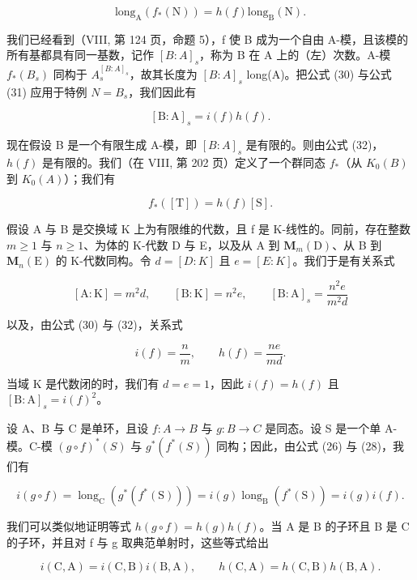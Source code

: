 \[
\mathrm{long} _ {\mathrm{A}} (f _ {*} (\mathrm{N})) = h (f) \mathrm{long} _ {\mathrm{B}} (\mathrm{N}).\tag{31}
\]

我们已经看到（VIII, 第 124 页，命题 5），f 使 B 成为一个自由 A-模，且该模的所有基都具有同一基数，记作 \([B:A]_{s}\)，称为 B 在 A 上的（左）次数。A-模 \(f_{*}(B_{s})\) 同构于 \(A_{s}^{[B:A]_{s}}\)，故其长度为 \([B:A]_{s}\) long(A)。把公式 (30) 与公式 (31) 应用于特例 \(N=B_{s}\)，我们因此有

\[
[ \mathrm{B}: \mathrm{A} ] _ {s} = i (f) h (f).\tag{32}
\]

现在假设 B 是一个有限生成 A-模，即 \([B:A]_{s}\) 是有限的。则由公式 (32)，\(h(f)\) 是有限的。我们（在 VIII, 第 202 页）定义了一个群同态 \(f_{*}\)（从 \(K_{0}(B)\) 到 \(K_{0}(A)\)）；我们有

\[
f _ {*} ([ \mathrm{T} ]) = h (f) [ \mathrm{S} ].\tag{33}
\]

假设 A 与 B 是交换域 K 上为有限维的代数，且 f 是 K-线性的。同前，存在整数 \(m \geqslant 1\) 与 \(n \geqslant 1\)、为体的 K-代数 D 与 E，以及从 A 到 \(\mathbf{M}_{m}(\mathrm{D})\)、从 B 到 \(\mathbf{M}_{n}(\mathrm{E})\) 的 K-代数同构。令 \(d = [D : K]\) 且 \(e = [E : K]\)。我们于是有关系式

\[
[ \mathrm{A}: \mathrm{K} ] = m ^ {2} d, \qquad [ \mathrm{B}: \mathrm{K} ] = n ^ {2} e, \qquad [ \mathrm{B}: \mathrm{A} ] _ {s} = \frac {n ^ {2} e}{m ^ {2} d}
\]

以及，由公式 (30) 与 (32)，关系式

\[
i (f) = \frac {n}{m}, \qquad h (f) = \frac {n e}{m d}.
\]

当域 \(\mathrm{K}\) 是代数闭的时，我们有 \(d = e = 1\)，因此 \(i(f) = h(f)\) 且 \([\mathrm{B}:\mathrm{A}]_s = i(f)^2\)。

设 A、B 与 C 是单环，且设 \(f: A \to B\) 与 \(g: B \to C\) 是同态。设 S 是一个单 A-模。C-模 \((g \circ f)^{*}(S)\) 与 \(g^{*}(f^{*}(S))\) 同构；因此，由公式 (26) 与 (28)，我们有

\[
i (g \circ f) = \operatorname{long} _ {\mathrm{C}} \left(g ^ {*} \left(f ^ {*} (\mathrm{S})\right)\right) = i (g) \operatorname{long} _ {\mathrm{B}} \left(f ^ {*} (\mathrm{S})\right) = i (g) i (f).
\]

我们可以类似地证明等式 \(h(g \circ f) = h(g)h(f)\)。当 A 是 B 的子环且 B 是 C 的子环，并且对 f 与 g 取典范单射时，这些等式给出

\[
i (\mathrm{C}, \mathrm{A}) = i (\mathrm{C}, \mathrm{B}) i (\mathrm{B}, \mathrm{A}), \qquad h (\mathrm{C}, \mathrm{A}) = h (\mathrm{C}, \mathrm{B}) h (\mathrm{B}, \mathrm{A}).\tag{34}
\]

